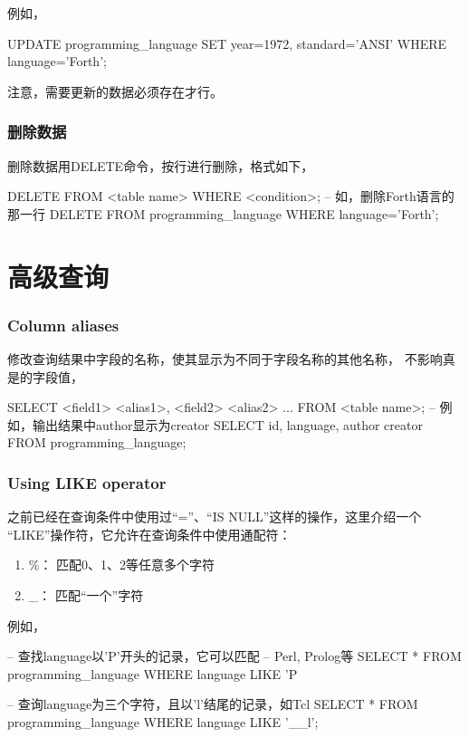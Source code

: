 \documentclass[a4paper,11pt]{article}
\begin{document}
例如，

\begin{sqlcode}
UPDATE programming_language SET year=1972, standard='ANSI'
    WHERE language='Forth';
\end{sqlcode}

注意，需要更新的数据必须存在才行。

\section[删除数据]{删除数据}
删除数据用DELETE命令，按行进行删除，格式如下，

\begin{sqlcode}
DELETE FROM <table name> WHERE <condition>;
-- 如，删除Forth语言的那一行
DELETE FROM programming_language WHERE language='Forth';
\end{sqlcode}


\part[高级查询]{高级查询}

\section[Column aliases]{Column aliases}
修改查询结果中字段的名称，使其显示为不同于字段名称的其他名称，
不影响真是的字段值，

\begin{sqlcode}
SELECT <field1> <alias1>, <field2> <alias2> ... FROM <table name>;
-- 例如，输出结果中author显示为creator
SELECT id, language, author creator FROM programming_language;
\end{sqlcode}

\section[Using LIKE operator]{Using LIKE operator}
之前已经在查询条件中使用过“=”、“IS NULL”这样的操作，这里介绍一个
“LIKE”操作符，它允许在查询条件中使用通配符：

\begin{enumerate}
\item \%： 匹配0、1、2等任意多个字符
\item \_： 匹配“一个”字符
\end{enumerate}

例如，

\begin{sqlcode}
-- 查找language以'P'开头的记录，它可以匹配
-- Perl, Prolog等
SELECT * FROM programming_language WHERE language LIKE 'P%

-- 查询language为三个字符，且以'l'结尾的记录，如Tcl
SELECT * FROM programming_language WHERE language LIKE '__l';
\end{sqlcode}
\end{document}
